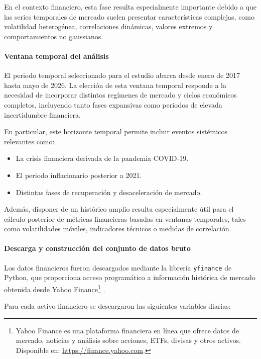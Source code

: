 \documentclass[
]{article}
\begin{document}
En el contexto financiero, esta fase resulta especialmente importante debido a que las series temporales de mercado suelen presentar características complejas, como volatilidad heterogénea, correlaciones dinámicas, valores extremos y comportamientos no gaussianos.

\paragraph{Ventana temporal del análisis}

El periodo temporal seleccionado para el estudio abarca desde enero de 2017 hasta mayo de 2026. La elección de esta ventana temporal responde a la necesidad de incorporar distintos regímenes de mercado y ciclos económicos completos, incluyendo tanto fases expansivas como periodos de elevada incertidumbre financiera.

En particular, este horizonte temporal permite incluir eventos sistémicos relevantes como:

\begin{itemize}
\item La crisis financiera derivada de la pandemia COVID-19.
\item El periodo inflacionario posterior a 2021.
\item Distintas fases de recuperación y desaceleración de mercado.
\end{itemize}

Además, disponer de un histórico amplio resulta especialmente útil para el cálculo posterior de métricas financieras basadas en ventanas temporales, tales como volatilidades móviles, indicadores técnicos o medidas de correlación.

\paragraph{Descarga y construcción del conjunto de datos bruto}

Los datos financieros fueron descargados mediante la librería 
\texttt{yfinance} de Python, que proporciona acceso programático a 
información histórica de mercado obtenida desde 
Yahoo Finance\footnote{Yahoo Finance es una plataforma financiera en línea que ofrece datos de mercado, noticias y análisis sobre acciones, ETFs, divisas y otros activos. Disponible en: \url{https://finance.yahoo.com}.} \parencite{yfinance,yahooFinance}.

Para cada activo financiero se descargaron las siguientes variables diarias:
\end{document}
